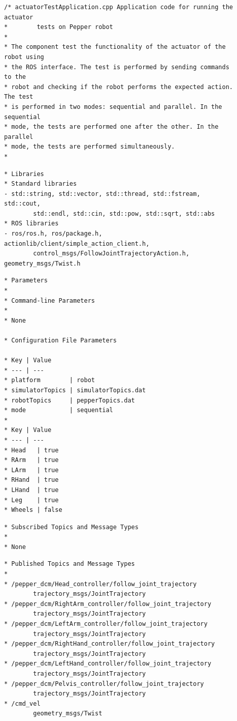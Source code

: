 \documentclass{CSSRforAfrica}
\newcommand{\checkboxChecked}{\fbox{\ding{51}}} %
\begin{document}
\begin{description}

\item[\checkboxChecked] 
 {\small 
\begin{verbatim}
/* actuatorTestApplication.cpp Application code for running the actuator
*        tests on Pepper robot
*
* The component test the functionality of the actuator of the robot using
* the ROS interface. The test is performed by sending commands to the
* robot and checking if the robot performs the expected action. The test
* is performed in two modes: sequential and parallel. In the sequential
* mode, the tests are performed one after the other. In the parallel
* mode, the tests are performed simultaneously. 
*
\end{verbatim}}

\item[\checkboxChecked] 
 {\small 
\begin{verbatim}
* Libraries
* Standard libraries
- std::string, std::vector, std::thread, std::fstream, std::cout,
        std::endl, std::cin, std::pow, std::sqrt, std::abs
* ROS libraries
- ros/ros.h, ros/package.h, actionlib/client/simple_action_client.h,
        control_msgs/FollowJointTrajectoryAction.h, geometry_msgs/Twist.h
\end{verbatim}}

\item[\checkboxChecked] 
 {\small 
\begin{verbatim}
* Parameters
*
* Command-line Parameters
*
* None

* Configuration File Parameters

* Key | Value 
* --- | ---
* platform        | robot
* simulatorTopics | simulatorTopics.dat
* robotTopics     | pepperTopics.dat
* mode            | sequential
*
* Key | Value
* --- | ---
* Head   | true
* RArm   | true
* LArm   | true
* RHand  | true
* LHand  | true
* Leg    | true
* Wheels | false
\end{verbatim}}

\item[\checkboxChecked] 
 {\small 
\begin{verbatim}
* Subscribed Topics and Message Types
*
* None
\end{verbatim}}

\item[\checkboxChecked] 
 {\small 
\begin{verbatim}                    
* Published Topics and Message Types
* 
* /pepper_dcm/Head_controller/follow_joint_trajectory
        trajectory_msgs/JointTrajectory
* /pepper_dcm/RightArm_controller/follow_joint_trajectory
        trajectory_msgs/JointTrajectory
* /pepper_dcm/LeftArm_controller/follow_joint_trajectory
        trajectory_msgs/JointTrajectory
* /pepper_dcm/RightHand_controller/follow_joint_trajectory
        trajectory_msgs/JointTrajectory
* /pepper_dcm/LeftHand_controller/follow_joint_trajectory
        trajectory_msgs/JointTrajectory
* /pepper_dcm/Pelvis_controller/follow_joint_trajectory 
        trajectory_msgs/JointTrajectory
* /cmd_vel
        geometry_msgs/Twist


\end{verbatim}}
\end{description}
\end{document}
